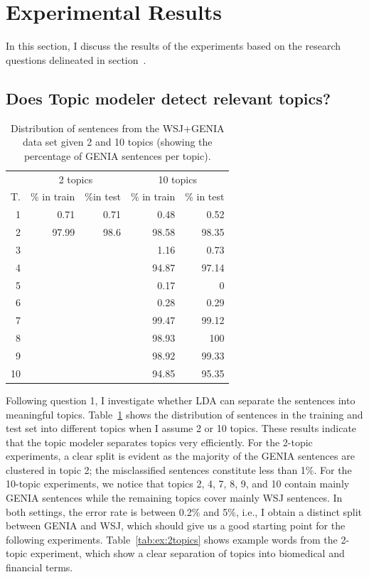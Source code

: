 \section{Experimental Results}\label{sec:results}


In this section, I discuss the results of the experiments based on the research questions delineated in section~\label{sec:quest}.
\subsection{Does Topic modeler detect relevant topics?}


\begin{table}[t!]
	\begin{center}
		\begin{tabular}{r|rr|rr} 
			& \multicolumn{2}{c|}{2 topics} & \multicolumn{2}{c}{10 topics}\\
			T. &\% in train & \%in test & \% in train & \% in test \\ 
			\hline
			1 	& 0.71	& 	0.71 	& 0.48 	& 0.52		\\ 
			2 	& 97.99	& 	98.6	& 98.58 	& 98.35				\\
			3 	& 		& 			& 1.16 	& 0.73			\\ 
			4 	& 		& 			& 94.87	& 97.14		\\
			5 	& 		& 			& 0.17	& 0			\\  
			6 	& 		& 			& 0.28 	& 0.29				\\  
			7 	& 		& 			& 99.47	& 99.12			\\  
			8 	& 		& 			& 98.93 	& 100		\\ 
			9 	& 		& 			& 98.92	& 99.33			\\ 
			10 	& 		&			& 94.85 	& 95.35			\\   
			\hline 
		\end{tabular}
	\end{center}
	\caption{Distribution of sentences from the WSJ+GENIA data set given 2 and 10 topics (showing the percentage of GENIA sentences per topic).\label{tab:cluster}}
\end{table}

Following question 1, I investigate whether LDA can separate the sentences into meaningful topics. 
Table~\ref{tab:cluster} shows the distribution of sentences in the training and test set into different topics when I assume 2 or 10 topics. These results indicate that the topic modeler separates topics very efficiently. For the 2-topic experiments, a clear split is evident as the majority of the GENIA sentences are clustered in topic 2; the misclassified sentences constitute less than 1\%. 
For the 10-topic experiments, we notice that topics 2, 4, 7, 8, 9, and 10 contain mainly GENIA sentences while the remaining topics cover mainly WSJ sentences. In both settings,  the error rate is between 0.2\% and 5\%, i.e., I obtain a distinct split between GENIA and WSJ, which should give us a good starting point for the following experiments. Table~\ref{tab:ex:2topics} shows example words from the 2-topic experiment, which show a clear separation of topics into biomedical and financial terms.


